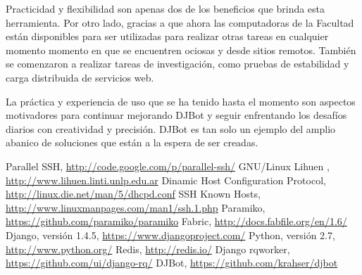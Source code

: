 \documentclass[runningheads,a4paper,titlepage]{llncs}
\begin{document}
Practicidad y flexibilidad son apenas dos de los beneficios que brinda esta
herramienta. Por otro lado, gracias a que ahora las computadoras de la Facultad
est\'an disponibles para ser utilizadas para realizar otras tareas en cualquier
momento 
momento en que se encuentren ociosas y desde sitios remotos. Tambi\'en se
comenzaron a realizar tareas de
investigaci\'on, como pruebas de estabilidad y
carga distribuida de servicios web.

La práctica y experiencia de uso que se ha tenido hasta el momento son aspectos
motivadores para continuar mejorando DJBot y seguir enfrentando los desafíos
diarios con creatividad y precisi\'on. DJBot es tan solo un ejemplo del amplio
abanico de
soluciones que est\'an a la espera de ser creadas.

\begin{thebibliography}{4}
 Parallel SSH, \url{http://code.google.com/p/parallel-ssh/}
 GNU/Linux Lihuen , \url{http://www.lihuen.linti.unlp.edu.ar}
 Dinamic Host Configuration Protocol,
\url{http://linux.die.net/man/5/dhcpd.conf}
 SSH Known Hosts,
\url{http://www.linuxmanpages.com/man1/ssh.1.php}
 Paramiko, \url{https://github.com/paramiko/paramiko}
 Fabric, \url{http://docs.fabfile.org/en/1.6/}
 Django, versi\'on 1.4.5, \url{https://www.djangoproject.com/}
 Python, versi\'on 2.7, \url{http://www.python.org/}
 Redis, \url{http://redis.io/}
 Django rqworker, \url{https://github.com/ui/django-rq/}
 DJBot, \url{https://github.com/krahser/djbot}
\end{thebibliography}
\end{document}
